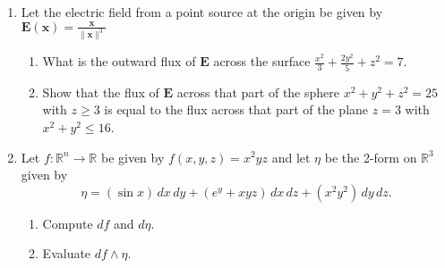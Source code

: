 \documentclass{article}
\newcommand{\norm}[1]{\| #1 \|}
\begin{document}
\begin{enumerate}
\item Let the electric field from a point source at the origin be given by $\displaystyle \boldsymbol E (\boldsymbol x) = \frac{\boldsymbol x}{\norm{\boldsymbol x}^3}$
    \begin{enumerate}
        \item What is the outward flux of $\boldsymbol E$ across the surface $\displaystyle \frac{x^2}{3} + \frac{2y^2}{5} + z^2 = 7$.
        \item Show that the flux of $\boldsymbol E$ across that part of the sphere $x^2 + y^2 + z^2 = 25$ with $z \geq 3$ is equal to the flux across that part of the plane $z = 3$ with $x^2 + y^2 \leq 16$.
    \end{enumerate} 
    \item Let $f : \mathbb{R}^n \rightarrow \mathbb{R}$ be given by $f(x,y,z) = x^2yz$ and let $\eta$ be the 2-form on $\mathbb{R}^3$ given by \[ \eta = (\sin x) \, dx \, dy + (e^y + xyz) \, dx \, dz + (x^2y^2) \, dy \, dz .\]
    \begin{enumerate}
        \item Compute $df$ and $d\eta$.
        \item Evaluate $df \wedge \eta$.
    \end{enumerate} 
\end{enumerate}
\end{document}

